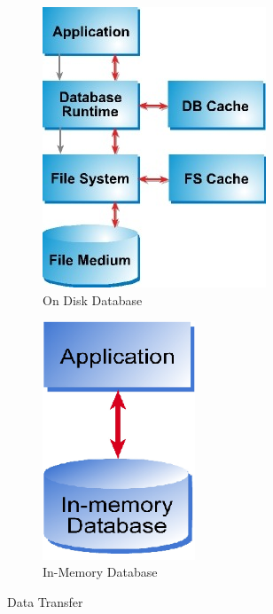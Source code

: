 \documentclass[12pt]{article} %
\begin{document}
\begin{figure}
	\centering
	\begin{subfigure}[b]{0.3\textwidth}
		\centering
		\includegraphics[width=\textwidth]{./pictures/fig3}
		\caption{On Disk Database}
		\label{fig:fig3a}
	\end{subfigure}
	\qquad \qquad
	\begin{subfigure}[b]{0.3\textwidth}
		\centering
		\includegraphics[width=0.5\textwidth]{./pictures/fig4}
		\caption{In-Memory Database}
		\label{fig:fig3b}
	\end{subfigure}
	\caption{Data Transfer}\label{fig:fig3}
\end{figure}
\end{document}
